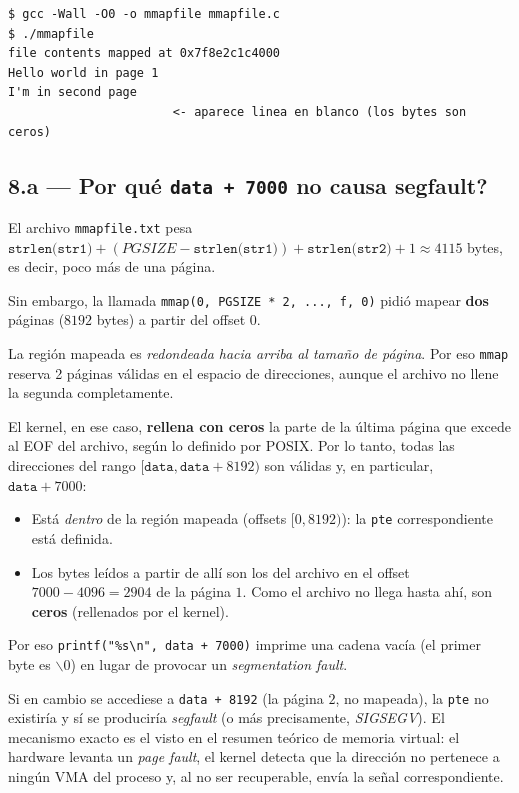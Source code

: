 \documentclass[11pt,a4paper]{article}
\begin{document}
\begin{lstlisting}[style=shellstyle]
$ gcc -Wall -O0 -o mmapfile mmapfile.c
$ ./mmapfile
file contents mapped at 0x7f8e2c1c4000
Hello world in page 1
I'm in second page
                       <- aparece linea en blanco (los bytes son ceros)
\end{lstlisting}

\subsection{8.a --- \textquestiondown{}Por qué \texttt{data + 7000} no causa segfault?}

El archivo \texttt{mmapfile.txt} pesa $\texttt{strlen(str1)} + (PGSIZE
- \texttt{strlen(str1)}) + \texttt{strlen(str2)} + 1 \approx 4115$
bytes, es decir, poco más de una página.

Sin embargo, la llamada \verb|mmap(0, PGSIZE * 2, ..., f, 0)| pidió
mapear \textbf{dos} páginas ($8192$ bytes) a partir del offset $0$.

\begin{importante}
La región mapeada es \emph{redondeada hacia arriba al tamaño de
página}. Por eso \texttt{mmap} reserva 2 páginas válidas en el espacio
de direcciones, aunque el archivo no llene la segunda completamente.
\end{importante}

El kernel, en ese caso, \textbf{rellena con ceros} la parte de la
última página que excede al EOF del archivo, según lo definido por
POSIX. Por lo tanto, todas las direcciones del rango
$[\texttt{data}, \texttt{data} + 8192)$ son válidas y, en particular,
$\texttt{data} + 7000$:

\begin{itemize}[leftmargin=*,nosep]
    \item Está \emph{dentro} de la región mapeada (offsets
        $[0, 8192)$): la \texttt{pte} correspondiente está definida.
    \item Los bytes leídos a partir de allí son los del archivo en el
        offset $7000 - 4096 = 2904$ de la página $1$. Como el archivo
        no llega hasta ahí, son \textbf{ceros} (rellenados por el
        kernel).
\end{itemize}

Por eso \texttt{printf("\%s\textbackslash{}n", data + 7000)} imprime
una cadena vacía (el primer byte es $\backslash 0$) en lugar de
provocar un \emph{segmentation fault}.

\begin{idea}
Si en cambio se accediese a \texttt{data + 8192} (la página $2$, no
mapeada), la \texttt{pte} no existiría y sí se produciría
\emph{segfault} (o más precisamente, \emph{SIGSEGV}). El mecanismo
exacto es el visto en el resumen teórico de memoria virtual: el
hardware levanta un \emph{page fault}, el kernel detecta que la
dirección no pertenece a ningún VMA del proceso y, al no ser
recuperable, envía la señal correspondiente.
\end{idea}
\end{document}
